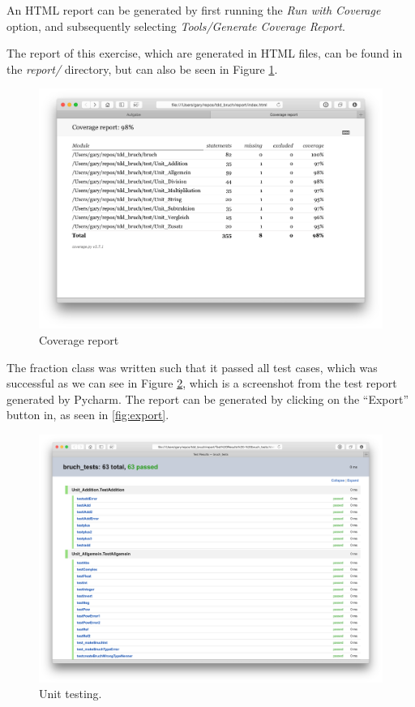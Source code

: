 \documentclass[../main/main.tex]{subfiles}
\begin{document}
An HTML report can be generated by first running the \textit{Run with
  Coverage} option, and subsequently selecting \textit{Tools/Generate
  Coverage Report}.

The report of this exercise, which are generated in HTML files, can be
found in the \textit{report/} directory, but can also be seen in
Figure \ref{fig:coverage}. 

\begin{figure}[H]
  \centering
  \includegraphics[width=\linewidth]{../figures/coverage_report.png}
  \caption{Coverage report}
  \label{fig:coverage}
\end{figure}

The fraction class was written such that it passed all test cases,
which was successful as we can see in Figure \ref{fig:unit}, which is
a screenshot from the test report generated by Pycharm. The report can be
generated by clicking on the ``Export'' button in, as seen in \ref{fig:export}.

\begin{figure}[H]
  \centering
  \includegraphics[width=0.7\linewidth]{../figures/unit_testing.png}
  \caption{Unit testing.}
  \label{fig:unit}
\end{figure}
\end{document}
